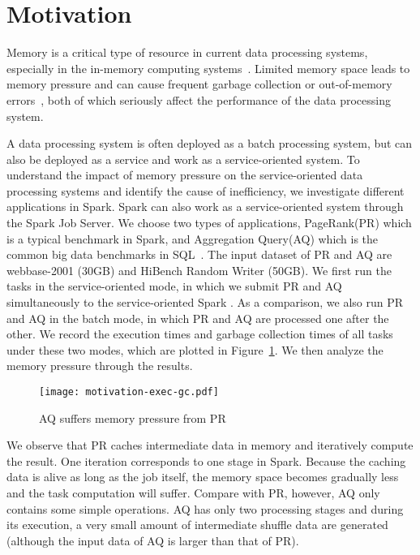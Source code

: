 \section{Motivation}
\label{sec:motivation}

Memory is a critical type of resource in current data processing systems, especially in the in-memory computing systems~\cite{shi:mammoth}. Limited memory space leads to memory pressure and can cause frequent garbage collection or out-of-memory errors~\cite{fang2015interruptible}, both of which seriously affect the performance of the data processing system. 

A data processing system is often deployed as a batch processing system, but can also be deployed as a service and work as a service-oriented system. To understand the impact of memory pressure on the service-oriented data processing systems and identify the cause of inefficiency, we investigate different applications in Spark.
Spark can also work as a service-oriented system through the Spark Job Server. 
We choose two types of applications, PageRank(PR) which is a typical benchmark in Spark, and Aggregation Query(AQ) which is the common big data benchmarks in SQL~\cite{www:benchmark}. The input dataset of PR and AQ are webbase-2001 (30GB) and HiBench Random Writer (50GB). We first run the tasks in the service-oriented mode, in which we submit PR and AQ simultaneously to the service-oriented Spark %
. As a comparison, we also run PR and AQ in the batch mode, in which PR and AQ are processed one after the other. We record the execution times and garbage collection times of all tasks under these two modes, which are plotted in Figure~\ref{fig:memorypressure}. We then analyze the  memory pressure through the results.   

\begin{figure}[!t]
\centering
\texttt{[image: motivation-exec-gc.pdf]}
\vspace{-2mm}
\caption{AQ suffers memory pressure from PR}
\vspace{-6mm}
\label{fig:memorypressure}
\end{figure}

We observe that PR caches intermediate data in memory and iteratively compute the result. One iteration corresponds to one stage in Spark. Because the caching data is alive as long as the job itself, the memory space becomes gradually less and the task computation will suffer. 
Compare with PR, however, AQ only contains some simple operations. AQ has only two processing stages and during its execution, a very small amount of intermediate shuffle data are generated (although the input data of AQ is larger than that of PR). 

